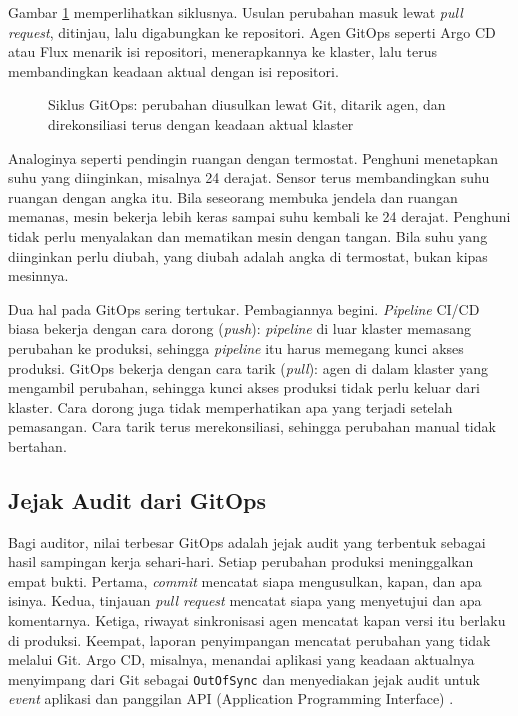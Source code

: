 Gambar \ref{fig:ch13-gitops} memperlihatkan siklusnya. Usulan perubahan masuk lewat
\textit{pull request}, ditinjau, lalu digabungkan ke repositori. Agen GitOps seperti Argo CD atau
Flux menarik isi repositori, menerapkannya ke klaster, lalu terus membandingkan keadaan aktual
dengan isi repositori.

\begin{figure}[!htb]
  \centering
  
  \caption{Siklus GitOps: perubahan diusulkan lewat Git, ditarik agen, dan direkonsiliasi terus
           dengan keadaan aktual klaster}
  \label{fig:ch13-gitops}
\end{figure}

Analoginya seperti pendingin ruangan dengan termostat. Penghuni menetapkan suhu yang diinginkan,
misalnya 24 derajat. Sensor terus membandingkan suhu ruangan dengan angka itu. Bila seseorang
membuka jendela dan ruangan memanas, mesin bekerja lebih keras sampai suhu kembali ke 24 derajat.
Penghuni tidak perlu menyalakan dan mematikan mesin dengan tangan. Bila suhu yang diinginkan perlu
diubah, yang diubah adalah angka di termostat, bukan kipas mesinnya.

Dua hal pada GitOps sering tertukar. Pembagiannya begini. \textit{Pipeline} CI/CD biasa bekerja
dengan cara dorong (\textit{push}): \textit{pipeline} di luar klaster memasang perubahan ke
produksi, sehingga \textit{pipeline} itu harus memegang kunci akses produksi. GitOps bekerja dengan
cara tarik (\textit{pull}): agen di dalam klaster yang mengambil perubahan, sehingga kunci akses
produksi tidak perlu keluar dari klaster. Cara dorong juga tidak memperhatikan apa yang terjadi
setelah pemasangan. Cara tarik terus merekonsiliasi, sehingga perubahan manual tidak bertahan.

\subsection{Jejak Audit dari GitOps}

Bagi auditor, nilai terbesar GitOps adalah jejak audit yang terbentuk sebagai hasil sampingan kerja
sehari-hari. Setiap perubahan produksi meninggalkan empat bukti. Pertama, \textit{commit} mencatat
siapa mengusulkan, kapan, dan apa isinya. Kedua, tinjauan \textit{pull request} mencatat siapa yang
menyetujui dan apa komentarnya. Ketiga, riwayat sinkronisasi agen mencatat kapan versi itu
berlaku di produksi. Keempat, laporan penyimpangan mencatat perubahan yang tidak melalui Git.
Argo CD, misalnya, menandai aplikasi yang keadaan aktualnya menyimpang dari Git sebagai
\texttt{OutOfSync} dan menyediakan jejak audit untuk \textit{event} aplikasi dan panggilan API
(Application Programming Interface) \cite{c13-argocd}.

